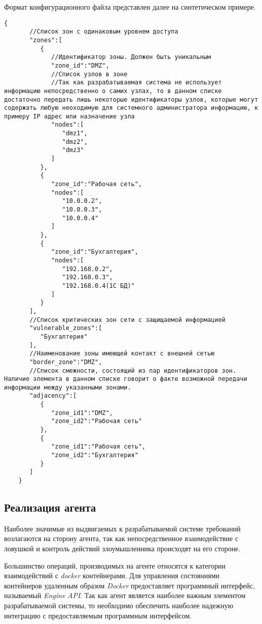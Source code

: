 Формат конфигурационного файла представлен далее на синтетическом примере.

\begin{lstlisting}[style=gostyle, label=lst:crossover]
	{  
	   //Список зон с одинаковым уровнем доступа
	   "zones":[  
	      {  
	         //Идентификатор зоны. Должен быть уникальным
	         "zone_id":"DMZ",
	         //Список узлов в зоне
	         //Так как разрабатываемая система не использует информацию непосредственно о самих узлах, то в данном списке достаточно передать лишь некоторые идентификаторы узлов, которые могут содержать любую неоходимую для системного администратора информацию, к примеру IP адрес или назначение узла
	         "nodes":[  
	            "dmz1",
	            "dmz2",
	            "dmz3"
	         ]
	      },
	      {  
	         "zone_id":"Рабочая сеть",
	         "nodes":[  
	            "10.0.0.2",
	            "10.0.0.3",
	            "10.0.0.4"
	         ]
	      },
	      {  
	         "zone_id":"Бухгалтерия",
	         "nodes":[  
	            "192.168.0.2",
	            "192.168.0.3",
	            "192.168.0.4(1C БД)"
	         ]
	      }
	   ],
	   //Список критических зон сети с защищаемой информацией
	   "vulnerable_zones":[  
	      "Бухгалтерия"
	   ],
	   //Наименование зоны имеющей контакт с внешней сетью
	   "border_zone":"DMZ",
	   //Список смежности, состоящий из пар идентификаторов зон. Наличие элемента в данном списке говорит о факте возможной передачи информации между указанными зонами.
	   "adjacency":[  
	      {  
	         "zone_id1":"DMZ",
	         "zone_id2":"Рабочая сеть"
	      },
	      {  
	         "zone_id1":"Рабочая сеть",
	         "zone_id2":"Бухгалтерия"
	      }
	   ]
	}
\end{lstlisting}


\subsection{Реализация агента}

Наиболее значимые из выдвигаемых к разрабатываемой системе требований возлагаются на сторону агента, так как непосредственное взаимодействие с ловушкой и контроль действий злоумышленника происходят на его стороне.

Большинство операций, производимых на агенте относятся к категории взаимодействий с \textit{docker} контейнерами. Для управления состояниями контейнеров удаленным образом \textit{Docker} предоставляет программный интерфейс, называемый \textit{Engine} \textit{API}. Так как агент является наиболее важным элементом разрабатываемой системы, то необходимо обеспечить наиболее надежную интеграцию с предоставляемым программным интерфейсом.

